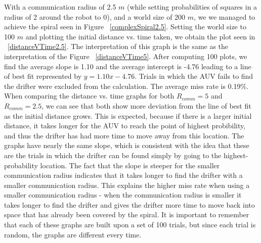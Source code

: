 \documentclass[a4paper, 11pt]{article} %
\begin{document}
\noindent With a communication radius of 2.5 $m$ (while setting probabilities of squares in a radius of 2 around the robot to 0), and a world size of 200 $m$, we we managed to achieve the spiral seen in Figure ~\ref{complexSpiral2.5}. Setting the world size to 100 $m$ and plotting the initial distance vs. time taken, we obtain the plot seen in ~\ref{distanceVTime2.5}. The interpretation of this graph is the same as the interpretation of the Figure ~\ref{distanceVTime5}. After computing 100 plots, we find the average slope is 1.10 and the average intercept is -4.76 leading to a line of best fit represented by $y = 1.10x - 4.76$. Trials in which the AUV fails to find the drifter were excluded from the calculation. The average miss rate is 0.19\%. \\

\noindent When comparing the distance vs. time graphs for both $R_{comm} = 5$ and $R_{comm} =2.5$, we can see that both show more deviation from the line of best fit as the initial distance grows. This is expected, because if there is a larger initial distance, it takes longer for the AUV to reach the point of highest probibility, and thus the drifter has had more time to move away from this location. The graphs have nearly the same slope, which is consistent with the idea that these are the trials in which the drifter can be found simply by going to the highest-probability location. The fact that the slope is steeper for the smaller communication radius indicates that it takes longer to find the drifter with a smaller communication radius. This explains the higher miss rate when using a smaller communication radius - when the communication radius is smaller it takes longer to find the drifter and gives the drifter more time to move back into space that has already been covered by the spiral. It is important to remember that each of these graphs are built upon a set of 100 trials, but since each trial is random, the graphs are different every time. 
\end{document}
